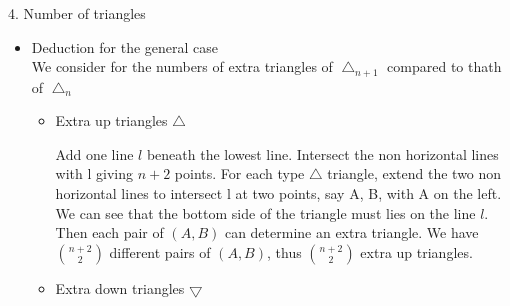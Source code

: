 \documentclass{beamer}
\begin{document}
\begin{frame}{4. Number of triangles}
\begin{itemize}
    \item Deduction for the general case\\
          We consider for the numbers of extra triangles of $\bigtriangleup_{n+1}$ compared to thath of
          $\bigtriangleup_{n}$
          \begin{itemize}
           \item Extra up triangles $\bigtriangleup$
                  \begin{minipage}{0.8\linewidth}
                    Add one line $l$ beneath the lowest line. Intersect the non horizontal
                    lines with l giving $n + 2$ points.
                    For each type $\bigtriangleup$ triangle, extend the two non horizontal
                    lines to intersect l at two points,
                    say A, B, with A on the left.
                    We can see that the bottom side of the triangle must lies on the line $l$. Then each pair of $(A,B)$
                    can determine an extra triangle. We have $\binom{n+2}{2}$ different pairs of $(A,B)$, thus
                    $\binom{n+2}{2}$
                    extra up triangles.
                  \end{minipage}%
                  \begin{minipage}{0.2\linewidth}
                \end{minipage}
             \framebreak
             \item Extra down triangles $\bigtriangledown$ 
                 
             
\begin{minipage}{0.7\linewidth}
                    

\end{minipage}
\end{itemize}
\end{itemize}
\end{frame}
\end{document}
